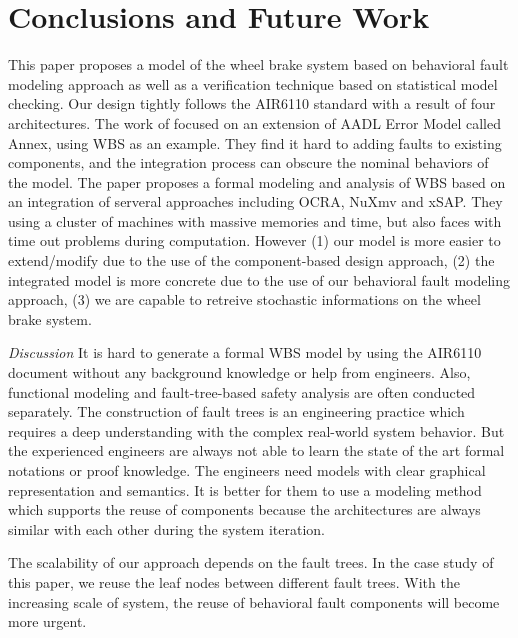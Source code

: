 \documentclass[conference]{IEEEtran}
\begin{document}















\section{Conclusions and Future Work}
This paper proposes a model of the wheel brake system based on behavioral fault modeling approach as well as a verification technique based on statistical model checking. Our design tightly follows the AIR6110 standard with a result of four architectures. The work of\cite{aadl14}\cite{aadl} focused on an extension of AADL Error Model called Annex, using WBS as an example. They find it hard to adding faults to existing components, and the integration process can obscure the nominal behaviors of the model. The paper\cite{cav15} proposes a formal modeling and analysis of WBS based on an integration of serveral approaches including OCRA, NuXmv and xSAP. They using a cluster of machines with massive memories and time, but also faces with time out problems during computation. However (1) our model is more easier to extend/modify due to the use of the component-based design approach, (2) the integrated model is more concrete due to the use of our behavioral fault modeling approach, (3) we are capable to retreive stochastic informations on the wheel brake system.

\emph{Discussion} It is hard to generate a formal WBS model by using the AIR6110 document without any background knowledge or help from engineers. Also, functional modeling and fault-tree-based safety analysis are often conducted separately.  The construction of fault trees is an engineering practice which requires a deep understanding with the complex real-world system behavior. But the experienced engineers are always not able to learn the state of the art formal notations or proof knowledge. The engineers need models with clear graphical representation and semantics. It is better for them to use a modeling method which supports the reuse of components because the architectures are always similar with each other during the system iteration.

The scalability of our approach depends on the fault trees. In the case study of this paper, we reuse the leaf nodes between different fault trees. With the increasing scale of system, the reuse of behavioral fault components will become more urgent.
\end{document}
